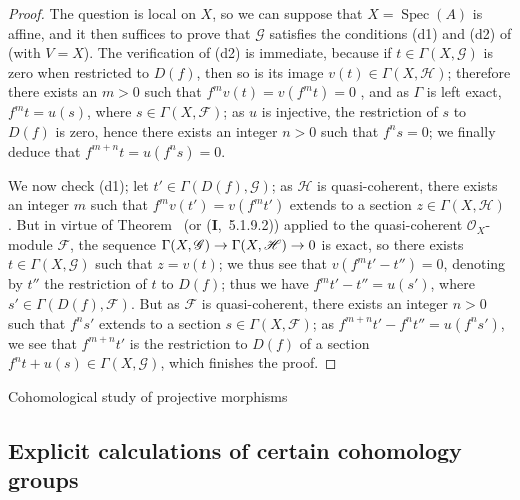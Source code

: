 \documentclass[oneside]{amsart}
\makeatletter
\theoremstyle{ega-env-style}
\theoremstyle{ega-thm-env-style}
\theoremstyle{ega-defn-env-style}
\def\section{\@startsection{section}{1}%
  \z@{.7\linespacing\@plus\linespacing}{.5\linespacing}%
  {\normalfont\bfseries\Large\scshape\centering}}
\def\mathcal{\mathscr}
\def\sh{\mathcal}                   %
\def\Spec{\operatorname{Spec}}
\renewcommand{\to}{\mathchoice{\longrightarrow}{\rightarrow}{\rightarrow}{\rightarrow}}
\newcommand{\oldpage}[2][]{{\marginnote{\normalfont{\textbf{#1}~|~#2}}}\ignorespaces}
\let\EGAOriginalLabel\label
\renewcommand{\label}[1]{\phantomsection\EGAOriginalLabel{#1}}
\makeatother
\begin{document}
\oldpage[III]{95}
\begin{proof}
The question is local on $X$, so we can suppose that $X=\Spec(A)$ is affine, and it then suffices to prove that $\sh{G}$ satisfies the conditions (d1) and (d2) of  (with $V=X$).
The verification of (d2) is immediate, because if $t\in\Gamma(X,\sh{G})$ is zero when restricted to $D(f)$, then so is its image $v(t)\in\Gamma(X,\sh{H})$; therefore there exists an $m>0$ such that $f^m v(t)=v(f^m t)=0$ , and as $\Gamma$ is left exact, $f^m t=u(s)$, where $s\in\Gamma(X,\sh{F})$; as $u$ is injective, the restriction of $s$ to $D(f)$ is zero, hence  there exists an integer $n>0$ such that $f^n s=0$; we finally deduce that $f^{m+n}t=u(f^n s)=0$.

We now check (d1); let $t'\in\Gamma(D(f),\sh{G})$; as $\sh{H}$ is quasi-coherent, there exists an integer $m$ such that $f^m v(t')=v(f^m t')$ extends to a section $z\in\Gamma(X,\sh{H})$ .
But in virtue of Theorem~ (or (\textbf{I},~5.1.9.2)) applied to the quasi-coherent $\sh{O}_X$-module $\sh{F}$, the sequence $\Gamma(X,\sh{G})\to\Gamma(X,\sh{H})\to 0$ is exact, so there exists $t\in\Gamma(X,\sh{G})$ such that $z=v(t)$; we thus see that $v(f^m t'-t'')=0$, denoting by $t''$ the restriction of $t$ to $D(f)$; thus we have $f^m t'-t''=u(s')$, where $s'\in\Gamma(D(f),\sh{F})$.
But as $\sh{F}$ is quasi-coherent, there exists an integer $n>0$ such that $f^n s'$ extends to a section $s\in\Gamma(X,\sh{F})$; as $f^{m+n}t'-f^n t''=u(f^n s')$, we see that $f^{m+n}t'$ is the restriction to $D(f)$ of a section $f^n t+u(s)\in\Gamma(X,\sh{G})$, which finishes the proof.
\end{proof}
\section{Cohomological study of projective morphisms}
\label{section:III.2}


\subsection{Explicit calculations of certain cohomology groups}
\label{subsection:III.2.1}
\end{document}
